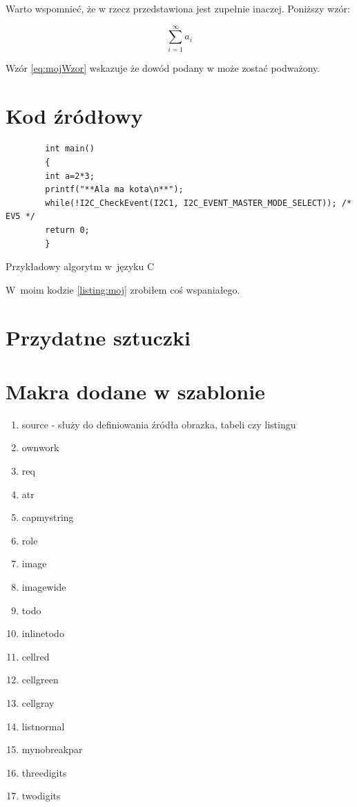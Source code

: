 \lipsum[19-20] Warto wspomnieć, że w\cite{aizawa_groundwater_2009} rzecz przedstawiona jest zupełnie inaczej. Poniższy wzór:

\begin{equation}
    \sum_{i=1}^{\infty}a_i
    \label{eq:mojWzor}
\end{equation}

Wzór \ref{eq:mojWzor} wskazuje że dowód podany w\cite{kaleta_experimental_2005} może zostać podważony. \lipsum[9]

\section{Kod źródłowy}

\begin{listing}[h!]
    \begin{verbatim}
        int main()
        {
        int a=2*3;
        printf("**Ala ma kota\n**");
        while(!I2C_CheckEvent(I2C1, I2C_EVENT_MASTER_MODE_SELECT)); /* EV5 */
        return 0;
        }
    \end{verbatim}
    \caption{Przykładowy algorytm w~języku C~\source{\ownwork}} \label{listing:moj}
\end{listing}

W~moim kodzie \ref{listing:moj} zrobiłem coś wspaniałego. \lipsum[4]

\section{Przydatne sztuczki}
\section{Makra dodane w szablonie}
\begin{enumerate}
    \item source - służy do definiowania źródła obrazka, tabeli czy listingu


    \item ownwork
    \item req
    \item atr
    \item capmystring
    \item role
    \item image
    \item imagewide
    \item todo
    \item inlinetodo
    \item cellred
    \item cellgreen
    \item cellgray
    \item listnormal
    \item mynobreakpar
    \item threedigits
    \item twodigits

\end{enumerate}


